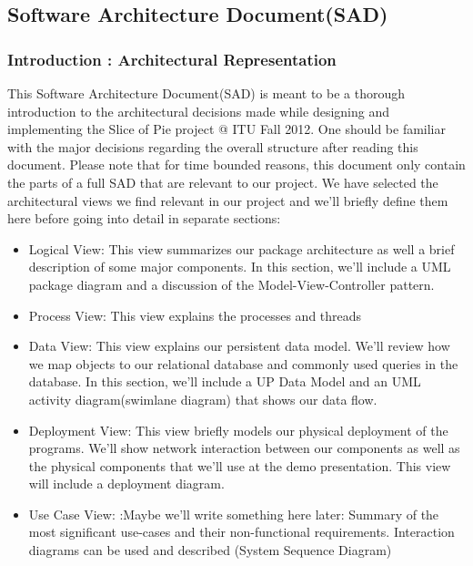 \subsection{Software Architecture Document(SAD)}
\subsubsection{Introduction : Architectural Representation}
This Software Architecture Document(SAD) is meant to be a thorough introduction to the architectural decisions made while designing and implementing the Slice of Pie project @ ITU Fall 2012.
One should be familiar with the major decisions regarding the overall structure after reading this document. Please note that for time bounded reasons, this document only contain the parts of a full SAD that are relevant to our project. 
We have selected the architectural views we find relevant in our project and we'll briefly define them here before going into detail in separate sections:
\begin{itemize}
\item Logical View: This view summarizes our package architecture as well a brief description of some major components. In this section, we'll include a UML package diagram and a discussion of the Model-View-Controller pattern.
\item Process View: This view explains the processes and threads
\item Data View: This view explains our persistent data model. We'll review how we map objects to our relational database and commonly used queries in the database. In this section, we'll include a UP Data Model and an UML activity diagram(swimlane diagram) that shows our data flow.
\item Deployment View: This view briefly models our physical deployment of the programs. We'll show network interaction between our components as well as the physical components that we'll use at the demo presentation. This view will include a deployment diagram.
\item Use Case View: :Maybe we'll write something here later: Summary of the most significant use-cases and their non-functional requirements. Interaction diagrams can be used and described (System Sequence Diagram)
\end{itemize}